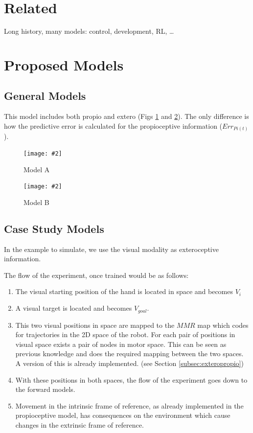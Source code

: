 \documentclass[11pt]{llncs}
\newcommand{\figone}[4]{
  \begin{figure}[ht]
  \begin{center}
  \texttt{[image: \#2]}
  \begin{sl}
  \caption{\label{#1}#3}
  \end{sl}
  \end{center}
  \end{figure}
}
\newcommand{\figtikz}[4]{
\begin{figure}[ht]
\begin{center}
\scalebox{#4}{}
\begin{sl}
\caption{\label{#1}#3}
\end{sl}
\end{center}
\end{figure}
}
\begin{document}
\section{Related}
\label{sec:orgf9aed21}

Long history, many models: control, development, RL, \ldots{}


\section{Proposed Models}
\label{plan}

\subsection{General Models}

This model includes both propio and extero (Figs \ref{fig:basic1}
and \ref{fig:basic2}). The only difference is how the 
predictive error is calculated for the propioceptive information ($Err_{Pi(t)}$).



\figone{fig:basic1}{Integral_v3}{Model A}{0.8}
\figone{fig:basic2}{Integral_v4}{Model B}{0.8}

\subsection{Case Study Models}

In the example to simulate, we use the visual modality as exteroceptive
information. 

The flow of the experiment, once trained would be as follows:

\begin{enumerate}
\item The visual starting position of the hand is located in space and becomes $V_i$
\item A visual target is located and becomes $V_{goal}$.
\item This two visual positions in space are mapped to the  $MMR$ map which
  codes for trajectories in the 2D space of the robot. For each pair of
  positions in visual space exists a pair of nodes in motor space. This can be
  seen as previous knowledge  and does the required mapping between the two
  spaces. A version of this is already implemented. (see Section \ref{subsec:exteropropio})
\item With these positions in both spaces, the flow of the experiment goes
  down to the forward models. 
\item Movement in the intrinsic frame of reference, as already implemented in the propioceptive model, has
  consequences on the environment which cause changes in the extrinsic frame
  of reference.  

\end{enumerate}
\end{document}
